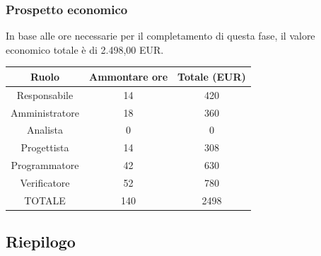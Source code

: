 \subsubsection{Prospetto economico}
In base alle ore necessarie per il completamento di questa fase, il valore economico totale è di 2.498,00 EUR.
\begin{center}
\begin{tabular}{ |c|c|c|  }
 \hline
 Ruolo 		& Ammontare ore 	& Totale (EUR)\\
 \hline
 \hline
 	Responsabile	& 14 	& 420\\
	Amministratore	& 18		& 360\\
	Analista		& 0 		& 0\\
	Progettista		& 14		& 308\\
	Programmatore	& 42		& 630\\
	Verificatore	& 52 	& 780\\
 \hline\hline
 TOTALE		& 140		& 2498\\
  \hline
\end{tabular}
\end{center}
\newpage
\subsection{Riepilogo}

